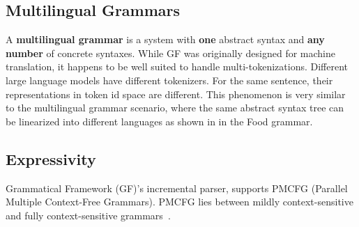 \subsection{Multilingual Grammars}\label{subsec:multilingual-grammars}

A \textbf{multilingual grammar} is a system with \textbf{one} abstract syntax and \textbf{any number} of concrete syntaxes.
%
While GF was originally designed for machine translation, it happens to be well suited to handle multi-tokenizations. Different large language models have different tokenizers. For the same sentence, their representations in token id space are different. This phenomenon is very similar to the multilingual grammar scenario, where the same abstract syntax tree can be linearized into different languages as shown in in the Food grammar.

\subsection{Expressivity}\label{subsec:expressivity}

Grammatical Framework (GF)'s incremental parser, supports PMCFG (Parallel Multiple Context-Free Grammars).
PMCFG lies between mildly context-sensitive and fully context-sensitive grammars~\cite{SEKI1991191}.



